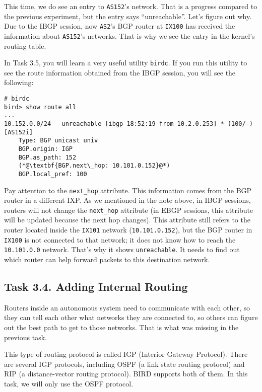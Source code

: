 This time, we do see an entry to \texttt{AS152}'s network. That is 
a progress compared to the previous experiment, 
but the entry says ``unreachable''. Let's figure out why. 
Due to the IBGP session, now \texttt{AS2}'s BGP router 
at \texttt{IX100} has received the information about 
\texttt{AS152}'s networks. That is why we see the entry in
the kernel's routing table. 

In Task 3.5, you will learn a very useful utility
\texttt{birdc}. If you run this utility to see
the route information obtained from 
the IBGP session, you will see the following:

\begin{lstlisting}
# birdc
bird> show route all
...
10.152.0.0/24   unreachable [ibgp 18:52:19 from 10.2.0.253] * (100/-) [AS152i]
	Type: BGP unicast univ
	BGP.origin: IGP
	BGP.as_path: 152
	(*@\textbf{BGP.next\_hop: 10.101.0.152}@*)
	BGP.local_pref: 100
\end{lstlisting}
 
Pay attention to the \texttt{next\_hop} attribute. This 
information comes from the BGP router in a different IXP. 
As we mentioned in the note above, in IBGP sessions, 
routers will not change the \texttt{next\_hop} attribute (in EBGP
sessions, this attribute will be updated because the 
next hop changes). This attribute still refers 
to the router located inside the \texttt{IX101} network (\texttt{10.101.0.152}),
but the BGP router in \texttt{IX100} is not 
connected to that network; it does not know  
how to reach the \texttt{10.101.0.0} network. That's 
why it shows \texttt{unreachable}. It needs to find
out which router can help forward packets to this destination network. 



\subsection{Task 3.4. Adding Internal Routing} 

Routers inside an autonomous system need to 
communicate with each other, so they can tell each other
what networks they are connected to, so others can figure out 
the best path to get to those networks. That is what
was missing in the previous task. 


This type of routing protocol is called IGP (Interior Gateway Protocol). 
There are several IGP protocols, including OSPF (a link state routing protocol) and RIP (a
distance-vector routing protocol). BIRD supports both of them. In this 
task, we will only use the OSPF protocol.

